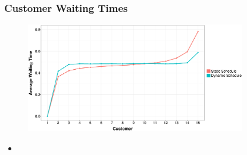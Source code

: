 \documentclass{beamer}
\begin{document}
\begin{frame}
	\frametitle{Customer Waiting Times}

	\begin{figure}
			\centering
			\includegraphics[width=0.85\textwidth]{WT_Line_Avg.eps}
	\end{figure}
		
	\begin{itemize}
		\item
	\end{itemize}
\end{frame}
\end{document}
